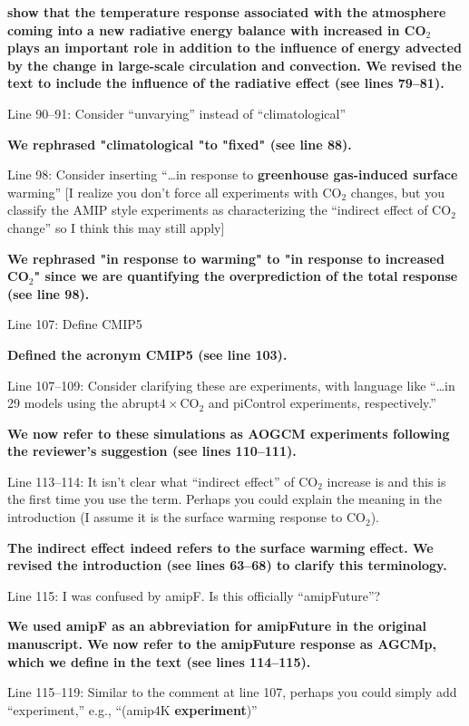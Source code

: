 \documentclass[11pt]{article}
\begin{document}
\cite{wang_understanding_2020} \textbf{show that the temperature response associated with the atmosphere coming into a new radiative energy balance with increased in CO$_2$ plays an important role in addition to the influence of energy advected by the change in large-scale circulation and convection. We revised the text to include the influence of the radiative effect (see lines 79--81).}

Line 90--91: Consider ``unvarying'' instead of ``climatological''

\textbf{We rephrased "climatological "to "fixed" (see line 88).}

Line 98: Consider inserting ``\ldots{}in response to \textbf{greenhouse gas-induced surface} warming'' [I realize you don't force all experiments with CO\(_2\) changes, but you classify the AMIP style experiments as characterizing the ``indirect effect of CO\(_2\) change'' so I think this may still apply]

\textbf{We rephrased "in response to warming" to "in response to increased CO\(_2\)" since we are quantifying the overprediction of the total response (see line 98).}

Line 107: Define CMIP5

\textbf{Defined the acronym CMIP5 (see line 103).}

Line 107--109: Consider clarifying these are experiments, with language like ``\ldots{}in 29 models using the abrupt\(4\times\)CO\(_2\) and piControl experiments, respectively.''

\textbf{We now refer to these simulations as AOGCM experiments following the reviewer's suggestion (see lines 110--111).}

Line 113--114: It isn't clear what ``indirect effect'' of CO\(_2\) increase is and this is the first time you use the term. Perhaps you could explain the meaning in the introduction (I assume it is the surface warming response to CO\(_2\)).

\textbf{The indirect effect indeed refers to the surface warming effect. We revised the introduction (see lines 63--68) to clarify this terminology.}

Line 115: I was confused by amipF. Is this officially ``amipFuture''?

\textbf{We used amipF as an abbreviation for amipFuture in the original manuscript. We now refer to the amipFuture response as AGCMp, which we define in the text (see lines 114--115).}

Line 115--119: Similar to the comment at line 107, perhaps you could simply add ``experiment,'' e.g., ``(amip4K \textbf{experiment})''
\end{document}
